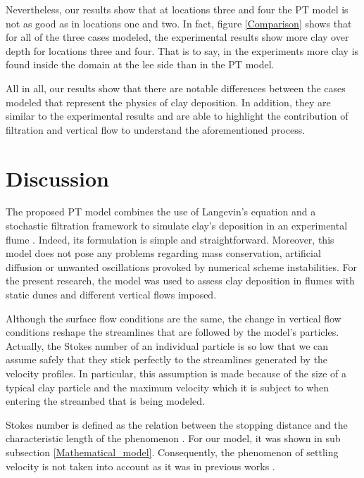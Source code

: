 \documentclass[draft,linenumbers]{agujournal2018}
\begin{document}
Nevertheless, our results show that at locations three and four the PT model is not as good as in locations one and two. In fact, figure \ref{Comparison} shows that for all of the three cases modeled, the experimental results show more clay over depth for locations three and four. That is to say, in the experiments more clay is found inside the domain at the lee side than in the PT model. 

All in all, our results show that there are notable differences between the cases modeled that represent the physics of clay deposition. In addition, they are similar to the experimental results and are able to highlight the contribution of filtration and vertical flow to understand the aforementioned process. 

\section{Discussion} \label{Discussion}

The proposed PT model combines the use of Langevin's equation and a stochastic filtration framework to simulate clay's deposition in an experimental flume \citep{Li2017}. Indeed, its formulation is simple and straightforward. Moreover, this model does not pose any problems regarding mass conservation, artificial diffusion or unwanted oscillations provoked by numerical scheme instabilities. For the present research, the model was used to assess clay deposition in flumes with static dunes and different vertical flows imposed. 

Although the surface flow conditions are the same, the change in vertical flow conditions reshape the streamlines that are followed by the model's particles. Actually, the Stokes number of an individual particle is so low that we can assume safely that they stick perfectly to the streamlines generated by the velocity profiles. In particular, this assumption is made because of the size of a typical clay particle and the maximum velocity which it is subject to when entering the streambed that is being modeled. 

Stokes number is defined as the relation between the stopping distance and the characteristic length of the phenomenon \citep{Clark2009}. For our model, it was shown in sub subsection \ref{Mathematical_model}. Consequently, the phenomenon of settling velocity is not taken into account as it was in previous works \citep{Packman2000}.
\end{document}
